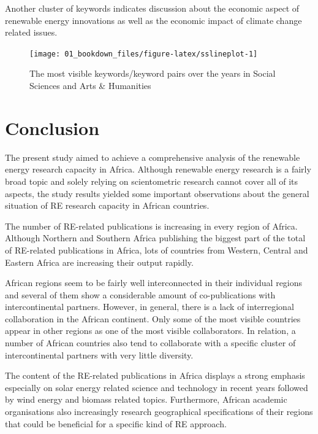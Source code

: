 \documentclass[
]{book}
\begin{document}
Another cluster of keywords indicates discussion about the economic aspect of renewable energy innovations as well as the economic impact of climate change related issues.

\begin{figure}
\texttt{[image: 01\_bookdown\_files/figure-latex/sslineplot-1]} \caption{The most visible keywords/keyword pairs over the years in Social Sciences and Arts & Humanities}\label{fig:sslineplot}
\end{figure}

\hypertarget{conclusion}{%
\chapter{Conclusion}\label{conclusion}}

The present study aimed to achieve a comprehensive analysis of the renewable energy research capacity in Africa. Although renewable energy research is a fairly broad topic and solely relying on scientometric research cannot cover all of its aspects, the study results yielded some important observations about the general situation of RE research capacity in African countries.

The number of RE-related publications is increasing in every region of Africa. Although Northern and Southern Africa publishing the biggest part of the total of RE-related publications in Africa, lots of countries from Western, Central and Eastern Africa are increasing their output rapidly.

African regions seem to be fairly well interconnected in their individual regions and several of them show a considerable amount of co-publications with intercontinental partners. However, in general, there is a lack of interregional collaboration in the African continent. Only some of the most visible countries appear in other regions as one of the most visible collaborators. In relation, a number of African countries also tend to collaborate with a specific cluster of intercontinental partners with very little diversity.

The content of the RE-related publications in Africa displays a strong emphasis especially on solar energy related science and technology in recent years followed by wind energy and biomass related topics. Furthermore, African academic organisations also increasingly research geographical specifications of their regions that could be beneficial for a specific kind of RE approach.
\end{document}
